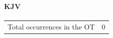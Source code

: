 		\paragraph{KJV}
			\label{AGENCY-OT-KJV}
	
			\begin{tabular}{ll}
				Total occurrences in the OT & 0
			\end{tabular}
			
			
		
			
				
			
		
